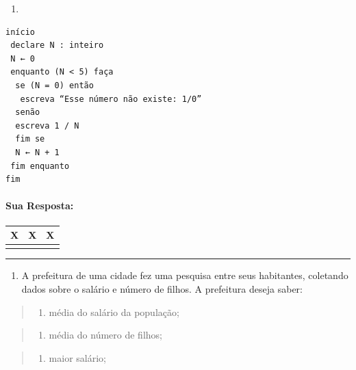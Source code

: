 \documentclass[12pt,a4paper]{article}
\renewcommand{\linethickness}{0.05em}
\providecommand{\tightlist}{%
      \setlength{\itemsep}{0pt}\setlength{\parskip}{0pt}}
\begin{document}
    \begin{enumerate}
\def\labelenumi{\alph{enumi})}
\setcounter{enumi}{7}
\item
\end{enumerate}

\begin{verbatim}
início
 declare N : inteiro
 N ← 0
 enquanto (N < 5) faça
  se (N = 0) então
   escreva “Esse número não existe: 1/0”
  senão
  escreva 1 / N
  fim se
  N ← N + 1
 fim enquanto
fim
\end{verbatim}

    \hypertarget{sua-resposta}{%
\paragraph{Sua Resposta:}\label{sua-resposta}}

\begin{longtable}[]{@{}ccc@{}}
\toprule
X & X & X\tabularnewline
\midrule
\endhead
& &\tabularnewline
\bottomrule
\end{longtable}

    \begin{center}\rule{0.5\linewidth}{\linethickness}\end{center}

\begin{enumerate}
\def\labelenumi{\arabic{enumi}.}
\setcounter{enumi}{4}
\tightlist
\item
  A prefeitura de uma cidade fez uma pesquisa entre seus habitantes,
  coletando dados sobre o salário e número de filhos. A prefeitura
  deseja saber:
\end{enumerate}

\begin{quote}
\begin{enumerate}
\def\labelenumi{\alph{enumi})}
\tightlist
\item
  média do salário da população;
\end{enumerate}
\end{quote}

\begin{quote}
\begin{enumerate}
\def\labelenumi{\alph{enumi})}
\setcounter{enumi}{1}
\tightlist
\item
  média do número de filhos;
\end{enumerate}
\end{quote}

\begin{quote}
\begin{enumerate}
\def\labelenumi{\alph{enumi})}
\setcounter{enumi}{2}
\tightlist
\item
  maior salário;
\end{enumerate}
\end{quote}
\end{document}
